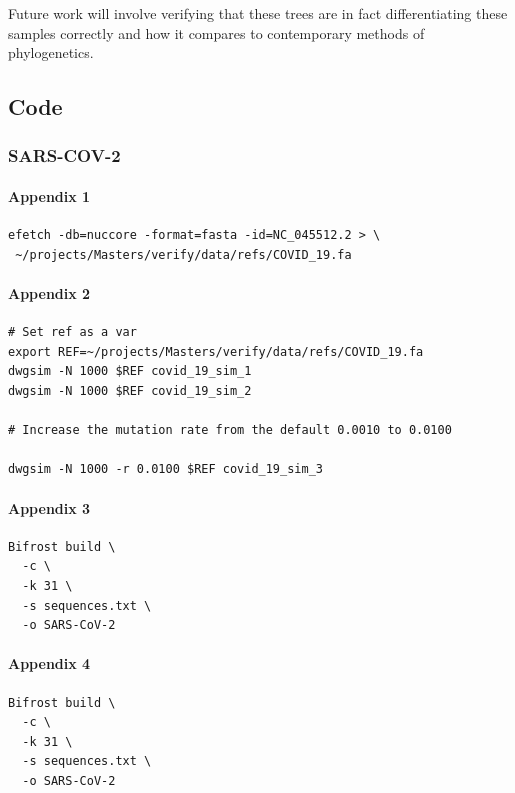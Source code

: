 \documentclass[10pt, a4paper]{article}
\begin{document}
Future work will involve verifying that these trees are in fact differentiating these samples correctly and how it compares to contemporary methods of phylogenetics.

\newpage



\begin{appendices}
\subsection{Code}
\label{sec:orga967261}
\subsubsection{SARS-COV-2}
\label{sec:org3559096}
\paragraph{Appendix 1}
\label{sec:orga6b34eb}
\begin{verbatim}
efetch -db=nuccore -format=fasta -id=NC_045512.2 > \
 ~/projects/Masters/verify/data/refs/COVID_19.fa
\end{verbatim}

\paragraph{Appendix 2}
\label{sec:orge0b44f1}
\begin{verbatim}
# Set ref as a var
export REF=~/projects/Masters/verify/data/refs/COVID_19.fa
dwgsim -N 1000 $REF covid_19_sim_1
dwgsim -N 1000 $REF covid_19_sim_2

# Increase the mutation rate from the default 0.0010 to 0.0100

dwgsim -N 1000 -r 0.0100 $REF covid_19_sim_3
\end{verbatim}


\paragraph{Appendix 3}
\label{sec:org00aa1b8}
\begin{verbatim}
Bifrost build \
  -c \
  -k 31 \
  -s sequences.txt \
  -o SARS-CoV-2
\end{verbatim}

\paragraph{Appendix 4}
\label{sec:orgb6fde09}
\begin{verbatim}
Bifrost build \
  -c \
  -k 31 \
  -s sequences.txt \
  -o SARS-CoV-2
\end{verbatim}


\end{appendices}
\end{document}
